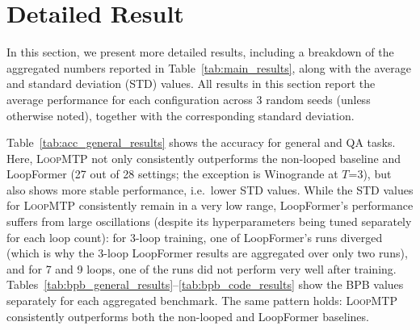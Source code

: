 \section{Detailed Result}
\label{sec:appendix:multiseed_results}

In this section, we present more detailed results, including a breakdown of the aggregated numbers reported in Table~\ref{tab:main_results}, along with the average and standard deviation (STD) values. All results in this section report the average performance for each configuration across 3 random seeds (unless otherwise noted), together with the corresponding standard deviation.


Table~\ref{tab:acc_general_results} shows the accuracy for general and QA tasks. Here, \textsc{LoopMTP} not only consistently outperforms the non-looped baseline and LoopFormer (27 out of 28 settings; the exception is Winogrande at $T$=3), but also shows more stable performance, i.e.\ lower STD values. While the STD values for \textsc{LoopMTP} consistently remain in a very low range, LoopFormer's performance suffers from large oscillations (despite its hyperparameters being tuned separately for each loop count): for 3-loop training, one of LoopFormer's runs diverged (which is why the 3-loop LoopFormer results are aggregated over only two runs), and for 7 and 9 loops, one of the runs did not perform very well after training. Tables~\ref{tab:bpb_general_results}--\ref{tab:bpb_code_results} show the BPB values separately for each aggregated benchmark. The same pattern holds: \textsc{LoopMTP} consistently outperforms both the non-looped and LoopFormer baselines.

